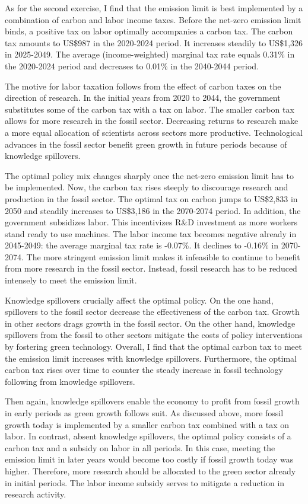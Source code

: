 As for the second exercise, I find that the emission limit is best implemented by a combination of carbon and labor income taxes. Before the net-zero emission limit binds, a positive tax on labor optimally accompanies a carbon tax. The carbon tax amounts to US\$987 in the 2020-2024 period. It increases steadily to US\$1,326 in 2025-2049. The average (income-weighted) marginal tax rate equals 0.31\% in the 2020-2024 period and decreases to 0.01\% in the 2040-2044 period.

The motive for labor taxation follows from the effect of carbon taxes on the direction of research. In the initial years from 2020 to 2044, the government substitutes some of the carbon tax with a tax on labor. The smaller carbon tax allows for more research in the fossil sector. Decreasing returns to research make a more equal allocation of scientists across sectors more productive. Technological advances in the fossil sector benefit green growth in future periods because of knowledge spillovers.

The optimal policy mix changes sharply once the net-zero emission limit has to be implemented. Now, the carbon tax rises steeply to discourage research and production in the fossil sector. The optimal tax on carbon jumps to US\$2,833 in 2050 and steadily increases to US\$3,186 in the 2070-2074 period. In addition, the government subsidizes labor. This incentivizes R\&D investment as more workers stand ready to use machines. The labor income tax becomes negative already in 2045-2049: the average marginal tax rate is -0.07\%. It declines to -0.16\% in 2070-2074. The more stringent emission limit makes it infeasible to continue to benefit from more research in the fossil sector. Instead, fossil research has to be reduced intensely to meet the emission limit.

Knowledge spillovers crucially affect the optimal policy.  On the one hand, spillovers to the fossil sector decrease the effectiveness of the carbon tax. Growth in other sectors drags growth in the fossil sector. On the other hand, knowledge spillovers from the fossil to other sectors mitigate the costs of policy interventions by fostering green technology. Overall, I find that the optimal carbon tax to meet the emission limit increases with knowledge spillovers. Furthermore, the optimal carbon tax rises over time to counter the steady increase in fossil technology following from knowledge spillovers. 

Then again, knowledge spillovers enable the economy to profit from fossil growth in early periods as green growth follows suit.  As discussed above, more fossil growth today is implemented by a smaller carbon tax combined with a tax on labor. In contrast, absent knowledge spillovers, the optimal policy consists of a carbon tax and a subsidy on labor in all periods. In this case, meeting the emission limit in later years would become too costly if fossil growth today was higher. Therefore, more research should be allocated to the green sector already in initial periods. The labor income subsidy serves to mitigate a reduction in research activity.



